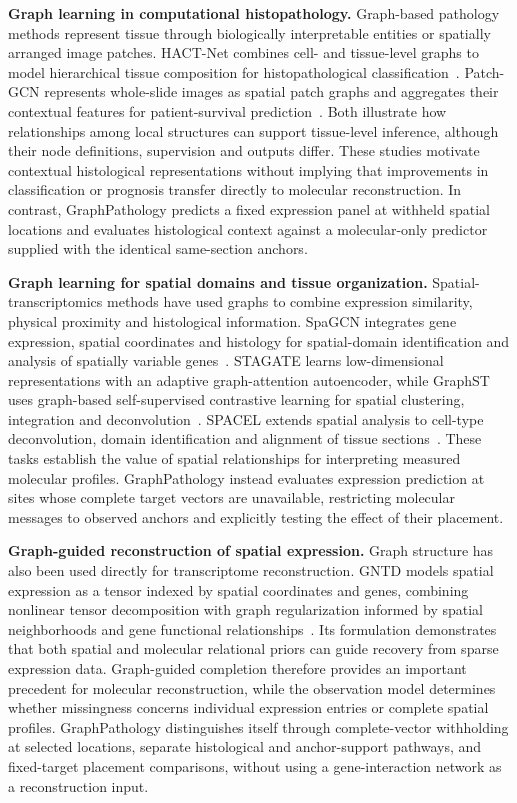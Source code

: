\noindent\textbf{Graph learning in computational histopathology.}
Graph-based pathology methods represent tissue through biologically interpretable entities or spatially arranged image patches. HACT-Net combines cell- and tissue-level graphs to model hierarchical tissue composition for histopathological classification~\cite{pati2022hact}. Patch-GCN represents whole-slide images as spatial patch graphs and aggregates their contextual features for patient-survival prediction~\cite{chen2021patchgcn}. Both illustrate how relationships among local structures can support tissue-level inference, although their node definitions, supervision and outputs differ. These studies motivate contextual histological representations without implying that improvements in classification or prognosis transfer directly to molecular reconstruction. In contrast, GraphPathology predicts a fixed expression panel at withheld spatial locations and evaluates histological context against a molecular-only predictor supplied with the identical same-section anchors.

\noindent\textbf{Graph learning for spatial domains and tissue organization.}
Spatial-transcriptomics methods have used graphs to combine expression similarity, physical proximity and histological information. SpaGCN integrates gene expression, spatial coordinates and histology for spatial-domain identification and analysis of spatially variable genes~\cite{hu2021spagcn}. STAGATE learns low-dimensional representations with an adaptive graph-attention autoencoder, while GraphST uses graph-based self-supervised contrastive learning for spatial clustering, integration and deconvolution~\cite{dong2022stagate,long2023graphst}. SPACEL extends spatial analysis to cell-type deconvolution, domain identification and alignment of tissue sections~\cite{spacel2023}. These tasks establish the value of spatial relationships for interpreting measured molecular profiles. GraphPathology instead evaluates expression prediction at sites whose complete target vectors are unavailable, restricting molecular messages to observed anchors and explicitly testing the effect of their placement.

\noindent\textbf{Graph-guided reconstruction of spatial expression.}
Graph structure has also been used directly for transcriptome reconstruction. GNTD models spatial expression as a tensor indexed by spatial coordinates and genes, combining nonlinear tensor decomposition with graph regularization informed by spatial neighborhoods and gene functional relationships~\cite{song2023gntd}. Its formulation demonstrates that both spatial and molecular relational priors can guide recovery from sparse expression data. Graph-guided completion therefore provides an important precedent for molecular reconstruction, while the observation model determines whether missingness concerns individual expression entries or complete spatial profiles. GraphPathology distinguishes itself through complete-vector withholding at selected locations, separate histological and anchor-support pathways, and fixed-target placement comparisons, without using a gene-interaction network as a reconstruction input.

